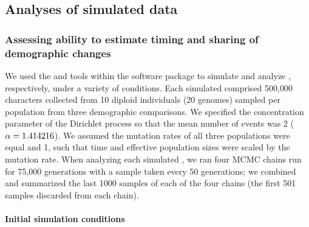 \subsection{Analyses of simulated data}

\subsubsection{Assessing ability to estimate timing and sharing of demographic changes}

We used the \simcoevolity and \ecoevolity tools within the \ecoevolity software
package to simulate and analyze \datasets,
respectively, under a variety of conditions.
Each simulated \dataset comprised 500,000 characters collected from 10 diploid
individuals (20 genomes) sampled per population from three demographic
comparisons.
We specified the concentration parameter of the Dirichlet process so that
the mean number of events was 2 ($\alpha = 1.414216$).
We assumed the mutation rates of all three populations were equal and 1, such
that time and effective population sizes were scaled by the mutation rate.
When analyzing each simulated \dataset, we ran four MCMC chains run for 75,000
generations with a sample taken every 50 generations; we combined and
summarized the last 1000 samples of each of the four chains (the first 501
samples discarded from each chain).

\paragraph{Initial simulation conditions}

